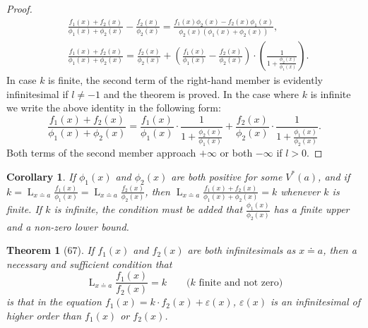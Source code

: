 \documentclass[a4paper,12pt]{book}[2004/02/16]
\providecommand{\colorbox}[2]{#2}
\newcommand{\correction}[2]{\colorbox{corr}{#1}}
\providecommand{\hypertarget}[2]{#2}
\theoremstyle{ilemma}
\theoremstyle{itheorem}
\newtheorem{theorem}{Theorem}
\theoremstyle{iother}
\theoremstyle{icorollary}
\newtheorem{corollary}{Corollary}
\theoremstyle{numcorollary}
\theoremstyle{idefinition}
\renewcommand{\dfrac}[2]{\frac{#1}{#2}}%
\begin{document}
\begin{proof}
\begin{align*}
  &\frac{f_1(x) + f_2(x)}{\phi_1(x) +
  \phi_2(x)}-\frac{f_2(x)}{\phi_2(x)} =
  \frac{f_1(x)\phi_2(x)-f_2(x)\phi_1(x)}{\phi_2(x)(\phi_1(x) +
  \phi_2(x))},\\
  &\frac{f_1(x) + f_2(x)}{\phi_1(x) + \phi_2(x)} =
  \frac{f_2(x)}{\phi_2(x)} +
  \left(\frac{f_1(x)}{\phi_1(x)}-\frac{f_2(x)}{\phi_2(x)}\right) \cdot
  \left(\frac{1}{1 + \dfrac{\phi_2(x)}{\phi_1(x)}} \right).
\end{align*}
In case $k$ is finite, the second term of the right-hand member is
evidently infinitesimal if $l \neq-1$ and the theorem is proved.  In
the case where $k$ is infinite we write the above identity in the
following form:
\[
  \frac{f_1(x) + f_2(x)}{\phi_1(x) + \phi_2(x)}
  = \frac{f_1(x)}{\phi_1(x)} \cdot \frac{1}{1 +
  \dfrac{\phi_2(x)}{\phi_1(x)}} + \frac{f_2(x)}{\phi_2(x)} \cdot
  \frac{1}{1 + \dfrac{\phi_1(x)}{\phi_2(x)}}.
\]
Both terms of the second member approach $+\infty$ or both $-\infty$
if $l>0$.
\end{proof}
\begin{corollary}
If $\phi_1(x)$ and $\phi_2(x)$ are both positive for some $V^*(a)$,
and if $\displaystyle k=\mathop{L}_{x\doteq a}
\frac{f_1(x)}{\phi_1(x)} = \mathop{L}_{x\doteq a}
\frac{f_2(x)}{\phi_2(x)}$, then $\displaystyle\mathop{L}_{\text{\correction{$x\doteq a$}{$x=a$}}}
\frac{f_1(x)+f_2(x)}{\phi_1(x)+\phi_2(x)} = k$
whenever $k$ is finite. If $k$ is infinite, the condition must be
added that $\dfrac{\phi_1(x)}{\phi_2(x)}$ has a finite upper and a
non-zero lower bound.
\end{corollary}

\begin{theorem}[67]\hypertarget{thm67}{}
If $f_1(x)$ and $f_2(x)$ are both infinitesimals as $x\doteq a$, then
a necessary and sufficient condition that
\[
  \mathop{L}_{x\doteq a} \frac{f_1(x)}{f_2(x)}
  =k\qquad \text{($k$ finite and not zero)}
\]
is that in the equation $f_1(x)=k\cdot f_2(x) + \varepsilon(x)$,
$\varepsilon(x)$ is an infinitesimal of higher order than $f_1(x)$ or
$f_2(x)$.
\end{theorem}
\end{document}
